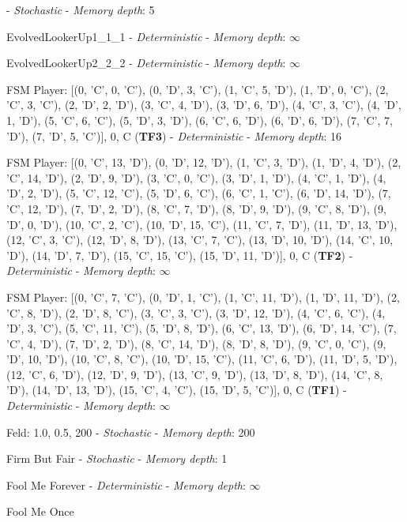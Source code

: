 - \textit{Stochastic} - \textit{Memory depth}: 5\item EvolvedLookerUp1\_1\_1
 - \textit{Deterministic} - \textit{Memory depth}: \(\infty\)\item EvolvedLookerUp2\_2\_2
 - \textit{Deterministic} - \textit{Memory depth}: \(\infty\)\item FSM Player: [(0, 'C', 0, 'C'), (0, 'D', 3, 'C'), (1, 'C', 5, 'D'), (1, 'D', 0, 'C'), (2, 'C', 3, 'C'), (2, 'D', 2, 'D'), (3, 'C', 4, 'D'), (3, 'D', 6, 'D'), (4, 'C', 3, 'C'), (4, 'D', 1, 'D'), (5, 'C', 6, 'C'), (5, 'D', 3, 'D'), (6, 'C', 6, 'D'), (6, 'D', 6, 'D'), (7, 'C', 7, 'D'), (7, 'D', 5, 'C')], 0, C
(\textbf{TF3}) - \textit{Deterministic} - \textit{Memory depth}: 16\item FSM Player: [(0, 'C', 13, 'D'), (0, 'D', 12, 'D'), (1, 'C', 3, 'D'), (1, 'D', 4, 'D'), (2, 'C', 14, 'D'), (2, 'D', 9, 'D'), (3, 'C', 0, 'C'), (3, 'D', 1, 'D'), (4, 'C', 1, 'D'), (4, 'D', 2, 'D'), (5, 'C', 12, 'C'), (5, 'D', 6, 'C'), (6, 'C', 1, 'C'), (6, 'D', 14, 'D'), (7, 'C', 12, 'D'), (7, 'D', 2, 'D'), (8, 'C', 7, 'D'), (8, 'D', 9, 'D'), (9, 'C', 8, 'D'), (9, 'D', 0, 'D'), (10, 'C', 2, 'C'), (10, 'D', 15, 'C'), (11, 'C', 7, 'D'), (11, 'D', 13, 'D'), (12, 'C', 3, 'C'), (12, 'D', 8, 'D'), (13, 'C', 7, 'C'), (13, 'D', 10, 'D'), (14, 'C', 10, 'D'), (14, 'D', 7, 'D'), (15, 'C', 15, 'C'), (15, 'D', 11, 'D')], 0, C
(\textbf{TF2}) - \textit{Deterministic} - \textit{Memory depth}: \(\infty\)\item FSM Player: [(0, 'C', 7, 'C'), (0, 'D', 1, 'C'), (1, 'C', 11, 'D'), (1, 'D', 11, 'D'), (2, 'C', 8, 'D'), (2, 'D', 8, 'C'), (3, 'C', 3, 'C'), (3, 'D', 12, 'D'), (4, 'C', 6, 'C'), (4, 'D', 3, 'C'), (5, 'C', 11, 'C'), (5, 'D', 8, 'D'), (6, 'C', 13, 'D'), (6, 'D', 14, 'C'), (7, 'C', 4, 'D'), (7, 'D', 2, 'D'), (8, 'C', 14, 'D'), (8, 'D', 8, 'D'), (9, 'C', 0, 'C'), (9, 'D', 10, 'D'), (10, 'C', 8, 'C'), (10, 'D', 15, 'C'), (11, 'C', 6, 'D'), (11, 'D', 5, 'D'), (12, 'C', 6, 'D'), (12, 'D', 9, 'D'), (13, 'C', 9, 'D'), (13, 'D', 8, 'D'), (14, 'C', 8, 'D'), (14, 'D', 13, 'D'), (15, 'C', 4, 'C'), (15, 'D', 5, 'C')], 0, C
(\textbf{TF1}) - \textit{Deterministic} - \textit{Memory depth}: \(\infty\)\item Feld: 1.0, 0.5, 200
 - \textit{Stochastic} - \textit{Memory depth}: 200\item Firm But Fair
 - \textit{Stochastic} - \textit{Memory depth}: 1\item Fool Me Forever
 - \textit{Deterministic} - \textit{Memory depth}: \(\infty\)\item Fool Me Once
